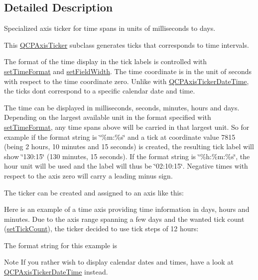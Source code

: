 \subsection{Detailed Description}
Specialized axis ticker for time spans in units of milliseconds to days. 



This \hyperlink{class_q_c_p_axis_ticker}{Q\+C\+P\+Axis\+Ticker} subclass generates ticks that corresponds to time intervals.

The format of the time display in the tick labels is controlled with \hyperlink{class_q_c_p_axis_ticker_time_a2f30b6e5125bce4256be9ce3177088ea}{set\+Time\+Format} and \hyperlink{class_q_c_p_axis_ticker_time_adc13e54fc969be98a5c0e3fa0dbaa293}{set\+Field\+Width}. The time coordinate is in the unit of seconds with respect to the time coordinate zero. Unlike with \hyperlink{class_q_c_p_axis_ticker_date_time}{Q\+C\+P\+Axis\+Ticker\+Date\+Time}, the ticks don\textquotesingle{}t correspond to a specific calendar date and time.

The time can be displayed in milliseconds, seconds, minutes, hours and days. Depending on the largest available unit in the format specified with \hyperlink{class_q_c_p_axis_ticker_time_a2f30b6e5125bce4256be9ce3177088ea}{set\+Time\+Format}, any time spans above will be carried in that largest unit. So for example if the format string is \char`\"{}\%m\+:\%s\char`\"{} and a tick at coordinate value 7815 (being 2 hours, 10 minutes and 15 seconds) is created, the resulting tick label will show \char`\"{}130\+:15\char`\"{} (130 minutes, 15 seconds). If the format string is \char`\"{}\%h\+:\%m\+:\%s\char`\"{}, the hour unit will be used and the label will thus be \char`\"{}02\+:10\+:15\char`\"{}. Negative times with respect to the axis zero will carry a leading minus sign.

The ticker can be created and assigned to an axis like this\+: 
\begin{DoxyCodeInclude}
\end{DoxyCodeInclude}
 Here is an example of a time axis providing time information in days, hours and minutes. Due to the axis range spanning a few days and the wanted tick count (\hyperlink{class_q_c_p_axis_ticker_a47752abba8293e6dc18491501ae34008}{set\+Tick\+Count}), the ticker decided to use tick steps of 12 hours\+:



The format string for this example is 
\begin{DoxyCodeInclude}
\end{DoxyCodeInclude}
 \begin{DoxyNote}{Note}
If you rather wish to display calendar dates and times, have a look at \hyperlink{class_q_c_p_axis_ticker_date_time}{Q\+C\+P\+Axis\+Ticker\+Date\+Time} instead. 
\end{DoxyNote}



